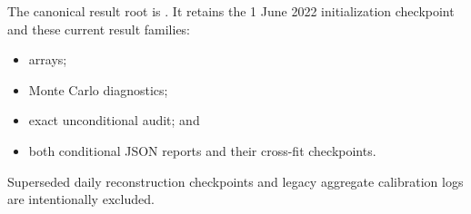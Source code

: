 \documentclass[11pt]{article}
\begin{document}
The canonical result root is
.
It retains the 1 June 2022 initialization checkpoint and these current result
families:
\begin{itemize}
  \item {} arrays;
  \item {} Monte Carlo diagnostics;
  \item {} exact unconditional audit; and
  \item both conditional JSON reports and their cross-fit checkpoints.
\end{itemize}
Superseded daily reconstruction checkpoints and legacy aggregate calibration
logs are intentionally excluded.
\end{document}

